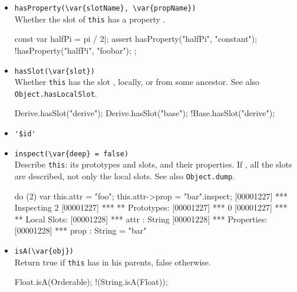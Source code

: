 \begin{itemize}
\begin{urbiscript}
class Base         { var this.base = 23; } |;
class Derive: Base { var this.derive = 43 } |;
assert(Derive.hasLocalSlot("derive"));
assert(!Derive.hasLocalSlot("base"));
\end{urbiscript}

\item \lstinline|hasProperty(\var{slotName}, \var{propName})|\\
  Whether the slot  of \lstinline|this| has a property
  .
\begin{urbiscript}
const var halfPi = pi / 2|;
assert
{
  hasProperty("halfPi", "constant");
  !hasProperty("halfPi", "foobar");
};
\end{urbiscript}

\item \lstinline|hasSlot(\var{slot})|\\
  Whether \lstinline|this| has the slot , locally, or from
  some ancestor.  See also \lstinline|Object.hasLocalSlot|.

\begin{urbiassert}
Derive.hasSlot("derive");
Derive.hasSlot("base");
!Base.hasSlot("derive");
\end{urbiassert}

\item \lstinline|'$id'|\\ %

\item \lstinline|inspect(\var{deep} = false)|\\
  Describe \lstinline|this|: its prototypes and slots, and their
  properties.  If , all the slots are described, not only
  the local slots. See also \lstinline|Object.dump|.
\begin{urbiscript}
do (2) { var this.attr = "foo"; this.attr->prop = "bar"}.inspect;
[00001227] *** Inspecting 2
[00001227] *** ** Prototypes:
[00001227] ***   0
[00001227] *** ** Local Slots:
[00001228] ***   attr : String
[00001228] ***     Properties:
[00001228] ***      prop : String = "bar"
\end{urbiscript}

\item \lstinline|isA(\var{obj})|\\
  Return true if \lstinline|this| has  in his parents, false
  otherwise.

\begin{urbiassert}
Float.isA(Orderable);
!(String.isA(Float));
\end{urbiassert}


\end{itemize}
